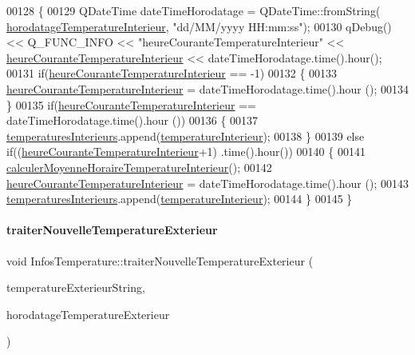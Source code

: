 \begin{DoxyCode}
00128 \{
00129     QDateTime dateTimeHorodatage = QDateTime::fromString(
      \hyperlink{class_infos_temperature_ad4c62d479b8897102a59025a56d7b4c6}{horodatageTemperatureInterieur}, \textcolor{stringliteral}{"dd/MM/yyyy HH:mm:ss"});
00130     qDebug() << Q\_FUNC\_INFO << \textcolor{stringliteral}{"heureCouranteTemperatureInterieur"} << 
      \hyperlink{class_infos_temperature_a708b70383d309fa0ba355dcc3921cc23}{heureCouranteTemperatureInterieur} << dateTimeHorodatage.time().hour();
00131     \textcolor{keywordflow}{if}(\hyperlink{class_infos_temperature_a708b70383d309fa0ba355dcc3921cc23}{heureCouranteTemperatureInterieur} == -1)
00132     \{
00133         \hyperlink{class_infos_temperature_a708b70383d309fa0ba355dcc3921cc23}{heureCouranteTemperatureInterieur} = dateTimeHorodatage.time().hour
      ();
00134     \}
00135     \textcolor{keywordflow}{if}(\hyperlink{class_infos_temperature_a708b70383d309fa0ba355dcc3921cc23}{heureCouranteTemperatureInterieur} == dateTimeHorodatage.time().hour
      ())
00136     \{
00137         \hyperlink{class_infos_temperature_a39a976c10811a7589e4aba42586813c5}{temperaturesInterieurs}.append(\hyperlink{class_infos_temperature_a976ab7ead7ac82b5b8572807d778689e}{temperatureInterieur});
00138     \}
00139     \textcolor{keywordflow}{else} \textcolor{keywordflow}{if}((\hyperlink{class_infos_temperature_a708b70383d309fa0ba355dcc3921cc23}{heureCouranteTemperatureInterieur}+1)%
      .time().hour())
00140     \{
00141         \hyperlink{class_infos_temperature_a8cb8b9bef07506019ea6c9d91809af87}{calculerMoyenneHoraireTemperatureInterieur}();
00142         \hyperlink{class_infos_temperature_a708b70383d309fa0ba355dcc3921cc23}{heureCouranteTemperatureInterieur} = dateTimeHorodatage.time().hour
      ();
00143         \hyperlink{class_infos_temperature_a39a976c10811a7589e4aba42586813c5}{temperaturesInterieurs}.append(\hyperlink{class_infos_temperature_a976ab7ead7ac82b5b8572807d778689e}{temperatureInterieur});
00144     \}
00145 \}
\end{DoxyCode}
\mbox{\label{class_infos_temperature_ab8d95f48c31ca17c8690849562268420}} 
\paragraph{\texorpdfstring{traiter\+Nouvelle\+Temperature\+Exterieur}{traiterNouvelleTemperatureExterieur}}
{\footnotesize\ttfamily void Infos\+Temperature\+::traiter\+Nouvelle\+Temperature\+Exterieur (\begin{DoxyParamCaption}\item[{Q\+String}]{temperature\+Exterieur\+String,  }\item[{Q\+String}]{horodatage\+Temperature\+Exterieur }\end{DoxyParamCaption})\hspace{0.3cm}{\ttfamily [slot]}}


